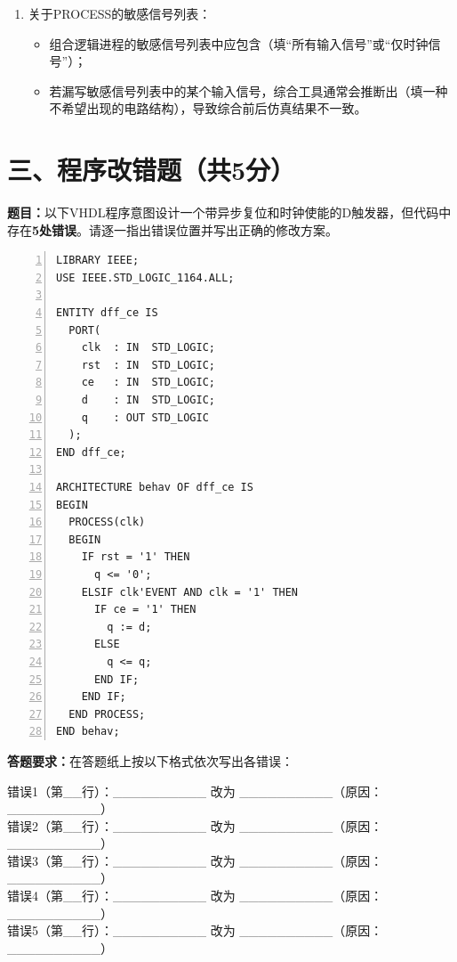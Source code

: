 \begin{enumerate}[label=\arabic*.]
\vspace{0.5cm}

\item 关于PROCESS的敏感信号列表：
\begin{itemize}
  \item 组合逻辑进程的敏感信号列表中应包含\underline{\hspace{4cm}}（填“所有输入信号”或“仅时钟信号”）；
  \item 若漏写敏感信号列表中的某个输入信号，综合工具通常会推断出\underline{\hspace{2.5cm}}（填一种不希望出现的电路结构），导致综合前后仿真结果不一致。
\end{itemize}

\end{enumerate}

\newpage

\section*{三、程序改错题（共5分）}

\textbf{题目：}以下VHDL程序意图设计一个带异步复位和时钟使能的D触发器，但代码中存在\textbf{5处错误}。请逐一指出错误位置并写出正确的修改方案。

\vspace{0.3cm}

\begin{lstlisting}[caption={带错误的D触发器程序（找出5处错误，每处1分）}, language=VDL, numbers=left]
LIBRARY IEEE;
USE IEEE.STD_LOGIC_1164.ALL;

ENTITY dff_ce IS
  PORT(
    clk  : IN  STD_LOGIC;
    rst  : IN  STD_LOGIC;
    ce   : IN  STD_LOGIC;
    d    : IN  STD_LOGIC;
    q    : OUT STD_LOGIC
  );
END dff_ce;

ARCHITECTURE behav OF dff_ce IS
BEGIN
  PROCESS(clk)
  BEGIN
    IF rst = '1' THEN
      q <= '0';
    ELSIF clk'EVENT AND clk = '1' THEN
      IF ce = '1' THEN
        q := d;
      ELSE
        q <= q;
      END IF;
    END IF;
  END PROCESS;
END behav;
\end{lstlisting}

\vspace{0.3cm}

\begin{framed}
\textbf{答题要求：}在答题纸上按以下格式依次写出各错误：

\noindent 错误1（第\_\_行）：\_\_\_\_\_\_\_\_\_\_ 改为 \_\_\_\_\_\_\_\_\_\_（原因：\_\_\_\_\_\_\_\_\_\_）\\
错误2（第\_\_行）：\_\_\_\_\_\_\_\_\_\_ 改为 \_\_\_\_\_\_\_\_\_\_（原因：\_\_\_\_\_\_\_\_\_\_）\\
错误3（第\_\_行）：\_\_\_\_\_\_\_\_\_\_ 改为 \_\_\_\_\_\_\_\_\_\_（原因：\_\_\_\_\_\_\_\_\_\_）\\
错误4（第\_\_行）：\_\_\_\_\_\_\_\_\_\_ 改为 \_\_\_\_\_\_\_\_\_\_（原因：\_\_\_\_\_\_\_\_\_\_）\\
错误5（第\_\_行）：\_\_\_\_\_\_\_\_\_\_ 改为 \_\_\_\_\_\_\_\_\_\_（原因：\_\_\_\_\_\_\_\_\_\_）
\end{framed}

